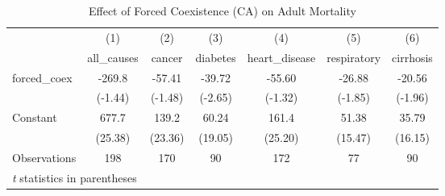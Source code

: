 \documentclass[12pt]{article}
\begin{document}
\begin{table}[htbp]\centering \caption{Effect of Forced Coexistence (CA) on Adult Mortality\label{adult1}} \begin{tabular}{l*{6}{c}} \toprule
                    &\multicolumn{1}{c}{(1)}&\multicolumn{1}{c}{(2)}&\multicolumn{1}{c}{(3)}&\multicolumn{1}{c}{(4)}&\multicolumn{1}{c}{(5)}&\multicolumn{1}{c}{(6)}\\
                    &\multicolumn{1}{c}{all\_causes}&\multicolumn{1}{c}{cancer}&\multicolumn{1}{c}{diabetes}&\multicolumn{1}{c}{heart\_disease}&\multicolumn{1}{c}{respiratory}&\multicolumn{1}{c}{cirrhosis}\\
\midrule
forced\_coex         &      -269.8&      -57.41&      -39.72&      -55.60&      -26.88&      -20.56\\
                    &     (-1.44)&     (-1.48)&     (-2.65)&     (-1.32)&     (-1.85)&     (-1.96)\\
\addlinespace
Constant            &       677.7&       139.2&       60.24&       161.4&       51.38&       35.79\\
                    &     (25.38)&     (23.36)&     (19.05)&     (25.20)&     (15.47)&     (16.15)\\
\midrule
Observations        &         198&         170&          90&         172&          77&          90\\
\bottomrule
\multicolumn{7}{l}{\footnotesize \textit{t} statistics in parentheses}\\
\end{tabular}
\end{table}
\end{document}
